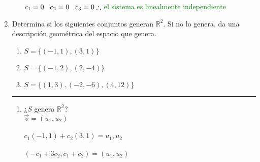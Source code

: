 \documentclass[a4paper,10pt]{article}
\begin{document}
\begin{enumerate}
\begin{enumerate}
            \textcolor{green}{$c_{1}=0\hspace{.3cm}{c_{2}=0\hspace{.3cm}{c_{3}=0}} \therefore$ el sistema es linealmente independiente}


    \end{enumerate}



     \item Determina si los siguientes conjuntos generan $\mathds{R}^2$. Si no lo genera, da una descripción geométrica del espacio que genera.
     
     \begin{enumerate}
         \item $S = \{(−1, 1),(3, 1)\}$
         \item $S = \{(−1, 2),(2, −4)\}$
         \item $S = \{(1, 3),(−2, −6),(4, 12)\}$
     \end{enumerate}

     {\color{oceanboatblue} \rule{\linewidth}{0.5mm} }

     \begin{enumerate}
         
        \item ¿$S$ genera $\mathds{R^{2}}$?\\
        
        $\vec{v}=(u_{1},u_{2})$\\\\ $c_{1}(-1,1)+c_{2}(3,1)=u_{1},u_{2}$\\\\
        $(-c_{1}+3c_{2},c_{1}+c_{2})=(u_{1},u_{2})$\\


\end{enumerate}
\end{enumerate}
\end{document}
